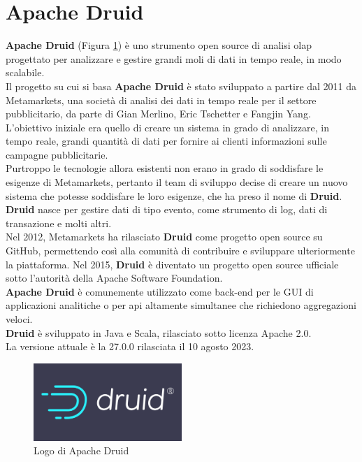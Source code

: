 \section{Apache Druid}
\textbf{Apache Druid} (Figura \ref{fig:logo_druid}) è uno strumento \gls{open source}{} di analisi \gls{olap}{} progettato per analizzare e gestire grandi moli di dati in tempo reale, in modo scalabile. \\
Il progetto su cui si basa \textbf{Apache Druid} è stato sviluppato a partire dal 2011 da Metamarkets, una società di analisi dei dati in tempo reale per il settore pubblicitario,
da parte di Gian Merlino, Eric Tschetter e Fangjin Yang.\\
L'obiettivo iniziale era quello di creare un sistema in grado di analizzare, in tempo reale, grandi quantità di dati per fornire ai clienti 
informazioni sulle campagne pubblicitarie.\\
Purtroppo le tecnologie allora esistenti non erano in grado di soddisfare le esigenze di Metamarkets, pertanto il team di sviluppo decise di creare un nuovo sistema che potesse soddisfare le loro esigenze, che ha preso il nome di \textbf{Druid}.\\
\textbf{Druid} nasce per gestire dati di tipo evento, come strumento di \gls{log}{}, dati di transazione e molti altri. \\
Nel 2012, Metamarkets ha rilasciato \textbf{Druid}{} come progetto \gls{open source}{} su GitHub, permettendo così alla comunità di contribuire e sviluppare ulteriormente la piattaforma. Nel 2015, \textbf{Druid} è diventato un progetto \gls{open source}{} ufficiale sotto l'autorità della \gls{Apache Software Foundation}{}.\\ 
\textbf{Apache Druid} è comunemente utilizzato come back-end per le GUI di applicazioni analitiche o
per \gls{api}{} altamente simultanee che richiedono aggregazioni veloci. \\
\textbf{Druid} è sviluppato in Java e Scala, rilasciato sotto licenza Apache 2.0. \\La versione attuale è la 27.0.0 rilasciata il 10 agosto 2023.\\
\begin{figure}[h]
    \centering
    \includegraphics[width=0.5\textwidth]{images/componenti/logo_druid.png}
    \caption{Logo di Apache Druid}
    \label{fig:logo_druid}
\end{figure}
\pagebreak
